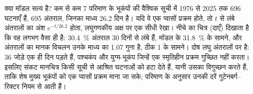 क्या मॉडल सत्य है? कम से कम 7 परिमाण के भूकंपों की वैश्विक सूची में 1976 से 2025 तक 696 घटनाएँ हैं,
695 अंतराल, जिनका माध्य 26.2 दिन है। यदि वे एक प्वासों प्रक्रम होते, तो
$t$ से लंबे अंतरालों का अंश $e^{-t/26.2}$ होता, लघुगणकीय अक्ष पर एक सीधी रेखा।
नीचे का चित्र (दाएँ) दिखाता है कि वह लगभग वैसा ही है: \qty{30.4}{\percent} अंतराल
30 दिनों से लंबे हैं, मॉडल के \qty{31.8}{\percent} के सामने, और अंतरालों का मानक विचलन
उनके माध्य का 1.07 गुना है, ठीक 1 के सामने। दोष लघु अंतरालों पर है: 36 जोड़े
एक ही दिन पड़ते हैं, पश्चकंप और युग्म-भूकंप जिन्हें एक स्मृतिहीन प्रक्रम गुच्छित नहीं करता। इसलिए संकट
मानचित्र किसी सूची से आश्रित घटनाओं को हटा देते हैं, यानी उसका विगुच्छन करते हैं, ताकि
शेष मुख्य भूकंपों को एक प्वासों प्रक्रम माना जा सके; परिमाण के अनुसार उनकी दरें
गुटेनबर्ग--रिक्टर नियम से आती हैं।

